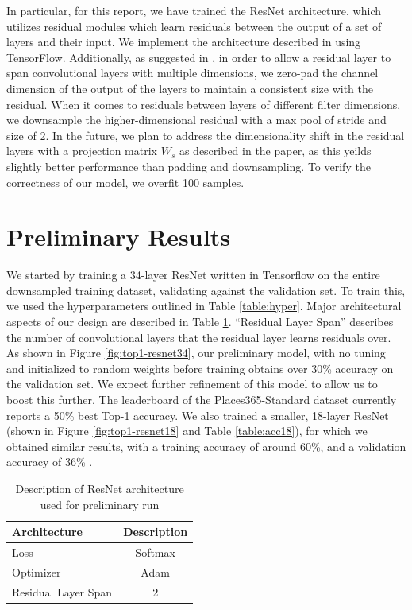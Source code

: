 \documentclass[10pt,twocolumn,letterpaper]{article}
\begin{document}
In particular, for this report, we have trained the ResNet architecture, which
utilizes residual modules which learn residuals between the output of a set of
layers and their input. We implement the architecture described in
\cite{ResNet} using TensorFlow.  Additionally, as suggested in \cite{ResNet},
in order to allow a residual layer to span convolutional layers with multiple
dimensions, we zero-pad the channel dimension of the output of the layers to maintain a consistent size with the residual. 
When it comes to residuals between layers of different filter dimensions, we downsample the higher-dimensional residual with a max pool of stride and size of 2. 
In the future, we plan to address the dimensionality shift in the residual layers with a projection matrix $W_s$ as described in the paper, as this yeilds slightly better performance than padding and downsampling. 
To verify the correctness of our model, we overfit 100 samples.\\

\section{Preliminary Results}

We started by training a 34-layer ResNet written in Tensorflow on the entire
downsampled training dataset, validating against the validation set. To train
this, we used the hyperparameters outlined in Table \ref{table:hyper}. Major
architectural aspects of our design are described in Table \ref{table:arch}.
``Residual Layer Span'' describes the number of convolutional layers that the
residual layer learns residuals over. \\

As shown in Figure \ref{fig:top1-resnet34}, our preliminary model, with no
tuning and initialized to random weights before training obtains over 30\%
accuracy on the validation set. We expect further refinement of this model to
allow us to boost this further. The leaderboard of the Places365-Standard dataset
currently reports a 50\% best Top-1 accuracy. We also trained a smaller,
18-layer ResNet (shown in Figure \ref{fig:top1-resnet18} and Table \ref{table:acc18}), for
which we obtained similar results, with
a training accuracy of around 60\%, and a validation accuracy of 36\% .\\

\begin{table}
\begin{center}
\begin{tabular}{|l|c|}
\hline
Architecture & Description \\
\hline\hline
Loss & Softmax\\
Optimizer & Adam\\
Residual Layer Span & 2 \\
\hline
\end{tabular}
\end{center}
\caption{Description of ResNet architecture used for preliminary run}
\label{table:arch}
\end{table}
\end{document}
